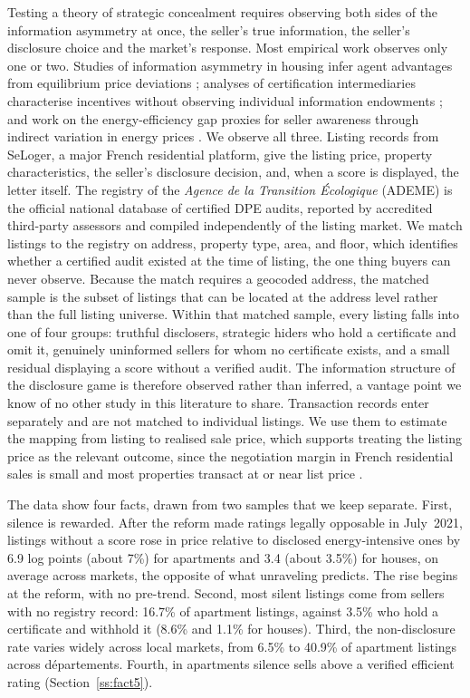 Testing a theory of strategic concealment requires observing both sides of the information
asymmetry at once, the seller's true information, the seller's disclosure choice and the
market's response. Most empirical work observes only one or two. Studies of information
asymmetry in housing infer agent advantages from equilibrium price deviations
\citep{levitt_syverson_2008}; analyses of certification intermediaries characterise incentives
without observing individual information endowments \citep{lizzeri_1999}; and work on the
energy-efficiency gap proxies for seller awareness through indirect variation in energy prices
\citep{myers_asymmetric_2020}. We observe all three. Listing records from SeLoger, a major
French residential platform, give the listing price, property characteristics, the seller's
disclosure decision, and, when a score is displayed, the letter itself. The registry of the
\emph{Agence de la Transition \'Ecologique} (ADEME) is the official national database of
certified DPE audits, reported by accredited third-party assessors and compiled independently
of the listing market. We match listings to the registry on address, property type, area, and
floor, which identifies whether a certified audit existed at the time of listing, the one
thing buyers can never observe. Because the match requires a geocoded address, the matched
sample is the subset of listings that can be located at the address level rather than the full
listing universe. Within that matched sample, every listing falls into one of four groups: truthful
disclosers, strategic hiders who hold a certificate and omit it, genuinely uninformed
sellers for whom no certificate exists, and a small residual displaying a score without a
verified audit. The information structure of the disclosure game is therefore observed rather
than inferred, a vantage point we know of no other study in this literature to share. Transaction
records enter separately and are not matched to individual listings. We use them to estimate
the mapping from listing to realised sale price, which supports treating the listing price as
the relevant outcome, since the negotiation margin in French residential sales is small and
most properties transact at or near list price
\citep{merlo_bargaining_2004, genesove_loss_2001, friggit_marche_2013}.

The data show four facts, drawn from two samples that we keep separate. First, silence is
rewarded. After the reform made ratings legally opposable in July~2021, listings without a score
rose in price relative to disclosed energy-intensive ones by 6.9 log points (about 7\%) for
apartments and 3.4 (about 3.5\%) for houses, on average across markets, the opposite of what
unraveling predicts. The rise begins at the reform, with no pre-trend. Second, most silent listings come from sellers with no registry record: 16.7\% of apartment
listings, against 3.5\% who hold a certificate and withhold it (8.6\% and 1.1\% for houses). Third, the
non-disclosure rate varies widely across local markets, from 6.5\% to 40.9\% of apartment
listings across d\'epartements. Fourth, in apartments silence sells above a verified efficient
rating (Section~\ref{ss:fact5}).

